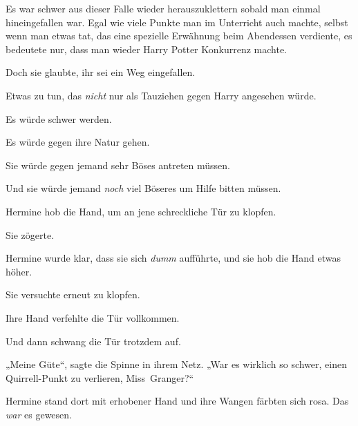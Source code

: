 Es war schwer aus dieser Falle wieder herauszuklettern sobald man einmal hineingefallen war. Egal wie viele Punkte man im Unterricht auch machte, selbst wenn man etwas tat, das eine spezielle Erwähnung beim Abendessen verdiente, es bedeutete nur, dass man wieder Harry Potter Konkurrenz machte.

Doch sie glaubte, ihr sei ein Weg eingefallen.

Etwas zu tun, das \emph{nicht} nur als Tauziehen gegen Harry angesehen würde.

Es würde schwer werden.

Es würde gegen ihre Natur gehen.

Sie würde gegen jemand sehr Böses antreten müssen.

Und sie würde jemand \emph{noch} viel Böseres um Hilfe bitten müssen.

Hermine hob die Hand, um an jene schreckliche Tür zu klopfen.

Sie zögerte.

Hermine wurde klar, dass sie sich \emph{dumm} aufführte, und sie hob die Hand etwas höher.

Sie versuchte erneut zu klopfen.

Ihre Hand verfehlte die Tür vollkommen.

Und dann schwang die Tür trotzdem auf.

„Meine Güte“, sagte die Spinne in ihrem Netz.
„War es wirklich so schwer, einen Quirrell-Punkt zu verlieren, Miss~Granger?“

Hermine stand dort mit erhobener Hand und ihre Wangen färbten sich rosa. Das \emph{war} es gewesen.

